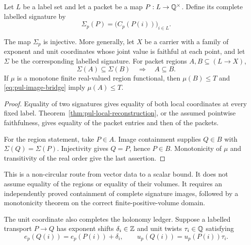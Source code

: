 Let $L$ be a label set and let a packet be a map
$P:L\to\mathbb Q^\times$.  Define its complete labelled signature by
\begin{equation}\label{eq:pul-labelled-signature}
             \Sigma_p(P)=\bigl(C_p(P(i))\bigr)_{i\in L}.
\end{equation}

\begin{theorem}
\label{thm:pul-labelled-region}
The map $\Sigma_p$ is injective.  More generally, let $X$ be a carrier with
a family of exponent and unit coordinates whose joint value is faithful at
each point, and let $\Sigma$ be the corresponding labelled signature.
For packet regions $A,B\subseteq(L\to X)$,
\begin{equation}\label{eq:pul-image-bridge}
                  \Sigma(A)\subseteq\Sigma(B)
                  \quad\Longrightarrow\quad A\subseteq B.
\end{equation}
If $\mu$ is a monotone finite real-valued region functional, then
$\mu(B)\le T$ and \eqref{eq:pul-image-bridge} imply $\mu(A)\le T$.
\end{theorem}

\begin{proof}
Equality of two signatures gives equality of both local coordinates at every
fixed label.  Theorem~\ref{thm:pul-local-reconstruction}, or the assumed
pointwise faithfulness, gives equality of the packet entries and then of the
packets.

For the region statement, take $P\in A$.  Image containment supplies
$Q\in B$ with $\Sigma(Q)=\Sigma(P)$.  Injectivity gives $Q=P$, hence
$P\in B$.  Monotonicity of $\mu$ and transitivity of the real order give the
last assertion.
\end{proof}

This is a non-circular route from vector data to a scalar bound.  It does not
assume equality of the regions or equality of their volumes.  It requires an
independently proved containment of complete signature images, followed by a
monotonicity theorem on the correct finite-positive-volume domain.

The unit coordinate also completes the holonomy ledger.  Suppose a labelled
transport $P\to Q$ has exponent shifts $\delta_i\in\mathbb Z$ and unit twists
$\tau_i\in\mathbb Q$ satisfying
\begin{equation}\label{eq:pul-vector-transport}
 e_p(Q(i))=e_p(P(i))+\delta_i,\qquad
 u_p(Q(i))=u_p(P(i))\tau_i.
\end{equation}

